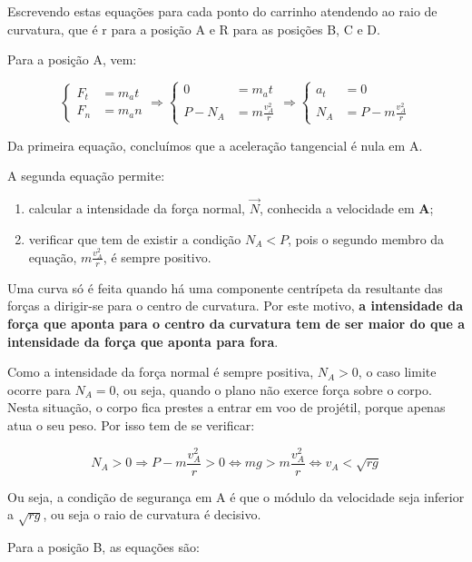 \documentclass[a4paper,11pt,oneside]{report}
\begin{document}
Escrevendo estas equações para cada ponto do carrinho atendendo ao raio de curvatura, 
que é r para a posição A e R para as posições B, C e D.

Para a posição A, vem: 

\[
\left\{
\begin{array}{cl}
F_t & = m_at \\
F_n & = m_an
\end{array}
\right.
\Rightarrow
\left\{
\begin{array}{cl}
0 & = m_at \\
P - N_A & = m\frac{v_{A}^{2}}{r}
\end{array}
\right.
\Rightarrow
\left\{
\begin{array}{cl}
a_t & = 0 \\
N_A & = P - m\frac{v_{A}^{2}}{r}
\end{array}
\right.
\]

Da primeira equação, concluímos que a aceleração tangencial é nula em A.

A segunda equação permite:
\begin{enumerate}
    \item calcular a intensidade da força normal, $\vec N$, conhecida a velocidade em \textbf{A};
    \item verificar que tem de existir a condição $N_A < P$, pois o segundo membro da equação, $m\frac{v_{A}^{2}}{r}$, é sempre positivo.
\end{enumerate}

Uma curva só é feita quando há uma componente centrípeta da resultante das forças a 
dirigir-se para o centro de curvatura. Por este motivo, \textbf{a intensidade da força 
que aponta para o centro da curvatura tem de ser maior do que a intensidade da força que 
aponta para fora}.

Como a intensidade da força normal é sempre positiva, $N_A > 0$, o caso limite ocorre para 
$N_A = 0$, ou seja, quando o plano não exerce força sobre o corpo. Nesta situação, o corpo 
fica prestes a entrar em voo de projétil, porque apenas atua o seu peso. Por isso tem de se 
verificar:

\[
N_A > 0 \Rightarrow P - m\frac{v_{A}^{2}}{r} > 0 \Leftrightarrow mg > m\frac{v_{A}^{2}}{r} \Leftrightarrow v_A < \sqrt{rg}
\]

Ou seja, a condição de segurança em A é que o módulo da velocidade seja inferior 
a $\sqrt{rg}$, ou seja o raio de curvatura é decisivo.

Para a posição B, as equações são: 
\end{document}
